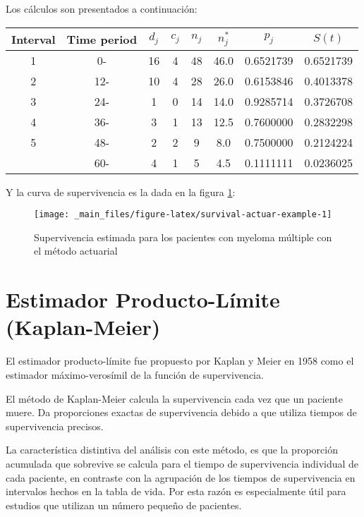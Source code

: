 \documentclass[
  a4paper,
  oneside,
  openany]{book}
\begin{document}
Los cálculos son presentados a continuación:

\begin{table}
\centering
\begin{tabular}{cccccccc}
\toprule
Interval & Time period & $d_j$ & $c_j$ & $n_j$ & $n_j^{*}$ & $p_j$ & $S(t)$\\
\midrule
1 & 0- & 16 & 4 & 48 & 46.0 & 0.6521739 & 0.6521739\\
2 & 12- & 10 & 4 & 28 & 26.0 & 0.6153846 & 0.4013378\\
3 & 24- & 1 & 0 & 14 & 14.0 & 0.9285714 & 0.3726708\\
4 & 36- & 3 & 1 & 13 & 12.5 & 0.7600000 & 0.2832298\\
5 & 48- & 2 & 2 & 9 & 8.0 & 0.7500000 & 0.2124224\\
\addlinespace
6 & 60- & 4 & 1 & 5 & 4.5 & 0.1111111 & 0.0236025\\
\bottomrule
\end{tabular}
\end{table}

Y la curva de supervivencia es la dada en la figura \ref{fig:survival-actuar-example}:

\begin{figure}

{\centering \texttt{[image: \_main\_files/figure-latex/survival-actuar-example-1]} 

}

\caption{Supervivencia estimada para los pacientes con myeloma múltiple con el método actuarial}\label{fig:survival-actuar-example}
\end{figure}

\hypertarget{estimador-producto-luxedmite-kaplan-meier}{%
\section{Estimador Producto-Límite (Kaplan-Meier)}\label{estimador-producto-luxedmite-kaplan-meier}}

El estimador producto-límite fue propuesto por Kaplan y Meier en 1958 como el estimador máximo-verosímil de la función de supervivencia.

El método de Kaplan-Meier calcula la supervivencia cada vez que un paciente muere. Da proporciones exactas de supervivencia debido a que utiliza tiempos de supervivencia precisos.

La característica distintiva del análisis con este método, es que la proporción acumulada que sobrevive se calcula para el tiempo de supervivencia individual de cada paciente, en contraste con la agrupación de los tiempos de supervivencia en intervalos hechos en la tabla de vida. Por esta razón es especialmente útil para estudios que utilizan un número pequeño de pacientes.
\end{document}
